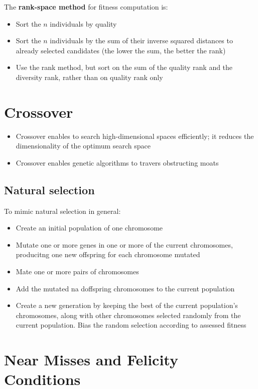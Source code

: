 \documentclass{article}
\begin{document}
The \textbf{rank-space method} for fitness computation is:
\begin{itemize}
  \item Sort the $n$ individuals by quality
  \item Sort the $n$ individuals by the sum of their inverse
    squared distances to already selected candidates (the lower the
    sum, the better the rank)
  \item Use the rank method, but sort on the sum of the quality
    rank and the diversity rank, rather than on quality rank only
\end{itemize}

\section{Crossover}

\begin{itemize}
  \item Crossover enables to search high-dimensional spaces efficiently; 
it reduces the dimensionality of the optimum search space
  \item Crossover enables genetic algorithms to travers obstructing
    moats
\end{itemize}

\subsection{Natural selection}

To mimic natural selection in general:
\begin{itemize}
  \item Create an initial population of one chromosome
  \item Mutate one or more genes in one or more of the current
    chromosomes, producitng one new offspring for each chromosome
    mutated
  \item Mate one or more pairs of chromosomes
  \item Add the mutated na doffspring chromosomes to the current
    population
  \item Create a new generation by keeping the best of the current
    population's chromosomes, along with other chromosomes selected
    randomly from the current population. Bias the random selection
    according to assessed fitness
\end{itemize}

\section{Near Misses and Felicity Conditions}
\end{document}
